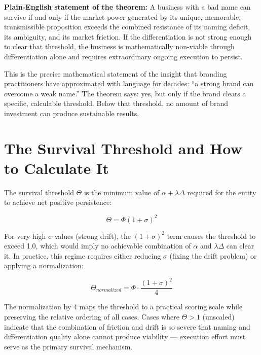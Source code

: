 \documentclass[12pt, openany]{book}
\theoremstyle{thmstyle}
\theoremstyle{defstyle}
\begin{document}
\textbf{Plain-English statement of the theorem:} A business with a bad name can survive if and only if the market power generated by its unique, memorable, transmissible proposition exceeds the combined resistance of its naming deficit, its ambiguity, and its market friction. If the differentiation is not strong enough to clear that threshold, the business is mathematically non-viable through differentiation alone and requires extraordinary ongoing execution to persist.

This is the precise mathematical statement of the insight that branding practitioners have approximated with language for decades: ``a strong brand can overcome a weak name.'' The theorem says: yes, but only if the brand clears a specific, calculable threshold. Below that threshold, no amount of brand investment can produce sustainable results.

\section{The Survival Threshold and How to Calculate It}

The survival threshold $\Theta$ is the minimum value of $\alpha + \lambda\Delta$ required for the entity to achieve net positive persistence:

\begin{equation}
\Theta = \Phi(1+\sigma)^2
\label{eq:threshold}
\end{equation}

For very high $\sigma$ values (strong drift), the $(1+\sigma)^2$ term causes the threshold to exceed 1.0, which would imply no achievable combination of $\alpha$ and $\lambda\Delta$ can clear it. In practice, this regime requires either reducing $\sigma$ (fixing the drift problem) or applying a normalization:

\begin{equation}
\Theta_{normalized} = \Phi \cdot \frac{(1+\sigma)^2}{4}
\label{eq:threshold_norm}
\end{equation}

The normalization by 4 maps the threshold to a practical scoring scale while preserving the relative ordering of all cases. Cases where $\Theta > 1$ (unscaled) indicate that the combination of friction and drift is so severe that naming and differentiation quality alone cannot produce viability --- execution effort must serve as the primary survival mechanism.
\end{document}
